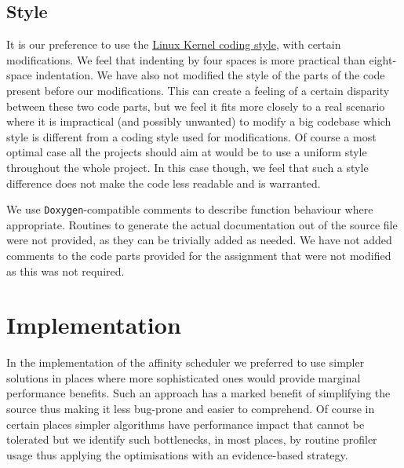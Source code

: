 \documentclass[11pt,a4paper]{article}
\begin{document}
\subsection{Style}
It is our preference to use the \href{https://www.kernel.org/doc/Documentation/CodingStyle}{Linux Kernel coding style}, with certain modifications. 
We feel that indenting by four spaces is more practical than eight-space indentation. 
We have also not modified the style of the parts of the code present before our modifications.
This can create a feeling of a certain disparity between these two code parts, but we feel it fits more closely to a real scenario where it is impractical (and possibly unwanted) to modify a big codebase which style is different from a coding style used for modifications.
Of course a most optimal case all the projects should aim at would be to use a uniform style throughout the whole project.
In this case though, we feel that such a style difference does not make the code less readable and is warranted.

We use \texttt{Doxygen}-compatible comments to describe function behaviour where appropriate. 
Routines to generate the actual documentation out of the source file were not provided, as they can be trivially added as needed.
We have not added comments to the code parts provided for the assignment that were not modified as this was not required.

\section{Implementation}
In the implementation of the affinity scheduler we preferred to use simpler solutions in places where more sophisticated ones would provide marginal performance benefits.
Such an approach has a marked benefit of simplifying the source thus making it less bug-prone and easier to comprehend.
Of course in certain places simpler algorithms have performance impact that cannot be tolerated but we identify such bottlenecks, in most places, by routine profiler usage thus applying the optimisations with an evidence-based strategy.
\end{document}
